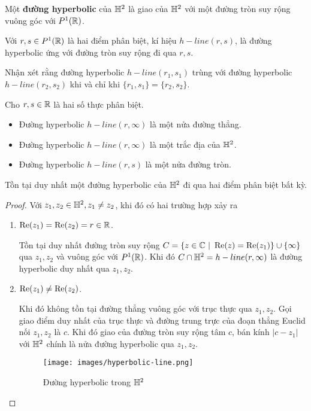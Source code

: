 \begin{defn}
    Một \textbf{đường hyperbolic} của $\mathbb{H}^2$ là giao của $\mathbb{H}^2$ với một đường tròn suy rộng vuông góc với $P^1(\mathbb{R})$.
    
    Với $r,s \in P^1(\mathbb{R})$ là hai điểm phân biệt, kí hiệu $h-line(r,s)$, là đường hyperbolic ứng với đường tròn suy rộng đi qua $r,s$.
\end{defn}
Nhận xét rằng đường hyperbolic $h-line(r_1,s_1)$ trùng với đường hyperbolic $h-line(r_2,s_2)$ khi và chỉ khi $\{r_1,s_1\} = \{r_2,s_2\}$.
\begin{exam*}
    Cho $r,s \in \mathbb{R}$ là hai số thực phân biệt.
    \begin{itemize}
        \item Đường hyperbolic $h-line(r,\infty)$ là một nửa đường thẳng.
        \item Đường hyperbolic $h-line(r,\infty)$ là một trắc địa của $\mathbb{H}^2$.
        \item Đường hyperbolic $h-line(r,s)$ là một nửa đường tròn.
    \end{itemize}
\end{exam*}
\begin{lem}\label{lem 2.2.14}
    Tồn tại duy nhất một đường hyperbolic của $\mathbb{H}^2$ đi qua hai điểm phân biệt bất kỳ.
\end{lem}
\begin{proof}
    Với $z_1,z_2 \in \mathbb{H}^2, z_1 \neq z_2$, khi đó có hai trường hợp xảy ra
    \begin{enumerate}
        \item $\operatorname{Re}(z_1) = \operatorname{Re}(z_2) = r\in \mathbb{R}$.
        
        Tồn tại duy nhất đường tròn suy rộng $C = \{ z\in \mathbb{C}~|~\operatorname{Re}(z) = \operatorname{Re}(z_1)\}\cup \{\infty\}$ qua $z_1,z_2$ và vuông góc với $P^1(\mathbb{R})$. Khi đó $C \cap \mathbb{H}^2 = h-line(r,\infty)$ là  đường hyperbolic duy nhất qua $z_1,z_2$.
        
        \item $\operatorname{Re}(z_1) \neq \operatorname{Re}(z_2)$.
        
        Khi đó không tồn tại đường thẳng vuông góc với trục thực qua $z_1,z_2$. Gọi giao điểm duy nhất của trục thực và đường trung trực của đoạn thẳng Euclid nối $z_1,z_2$ là $c$. Khi đó giao của đường tròn suy rộng tâm $c$, bán kính $|c-z_1|$ với $\mathbb{H}^2$ chính là nửa đường hyperbolic qua $z_1,z_2$.
        \begin{figure}[htp!]
            \centering
            \texttt{[image: images/hyperbolic-line.png]}
            \caption{Đường hyperbolic trong $\mathbb{H}^2$}
            \label{}
        \end{figure}
    \end{enumerate}
\end{proof}
